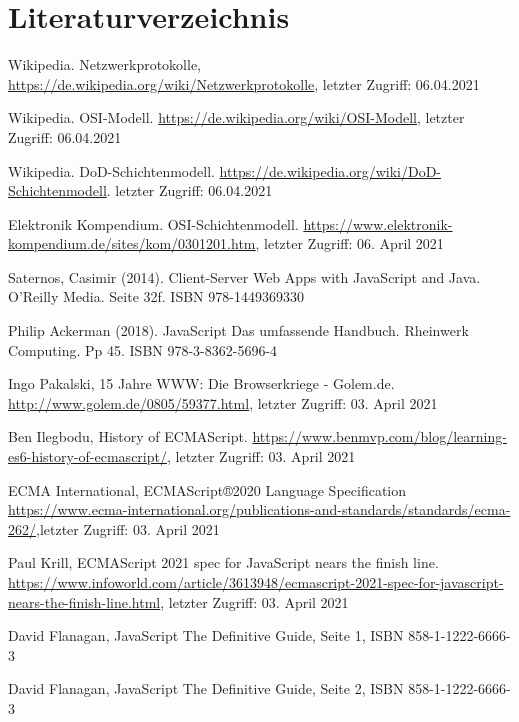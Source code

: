 \documentclass[11pt,a4paper]{article}
\begin{document}
\section*{Literaturverzeichnis}
\begin{itemize}
%
%
%
%

 Wikipedia. Netzwerkprotokolle, \url{https://de.wikipedia.org/wiki/Netzwerkprotokolle}, letzter Zugriff: 06.04.2021

  Wikipedia. OSI-Modell. \url{https://de.wikipedia.org/wiki/OSI-Modell}, letzter Zugriff: 06.04.2021

 Wikipedia. DoD-Schichtenmodell. \url{https://de.wikipedia.org/wiki/DoD-Schichtenmodell}. letzter Zugriff: 06.04.2021

 Elektronik Kompendium. OSI-Schichtenmodell. \url{https://www.elektronik-kompendium.de/sites/kom/0301201.htm}, letzter Zugriff: 06. April 2021

%
%
%
%

 Saternos, Casimir (2014). Client-Server Web Apps with JavaScript and Java. O'Reilly Media. Seite 32f. ISBN 978-1449369330

 Philip Ackerman (2018). JavaScript Das umfassende Handbuch. Rheinwerk Computing. Pp 45. ISBN 978-3-8362-5696-4

 Ingo Pakalski, 15 Jahre WWW: Die Browserkriege - Golem.de. \url{http://www.golem.de/0805/59377.html}, letzter Zugriff: 03. April 2021

 Ben Ilegbodu, History of ECMAScript.
\url{https://www.benmvp.com/blog/learning-es6-history-of-ecmascript/}, letzter Zugriff: 03. April 2021

 ECMA International, ECMAScript®2020 Language Specification \url{https://www.ecma-international.org/publications-and-standards/standards/ecma-262/},letzter Zugriff: 03. April 2021

 Paul Krill, ECMAScript 2021 spec for JavaScript nears the finish line. \url{https://www.infoworld.com/article/3613948/ecmascript-2021-spec-for-javascript-nears-the-finish-line.html}, letzter Zugriff: 03. April 2021

 David Flanagan, JavaScript The Definitive Guide,  Seite 1, ISBN 858-1-1222-6666-3

 David Flanagan, JavaScript The Definitive Guide,  Seite 2, ISBN 858-1-1222-6666-3


\end{itemize}
\end{document}
